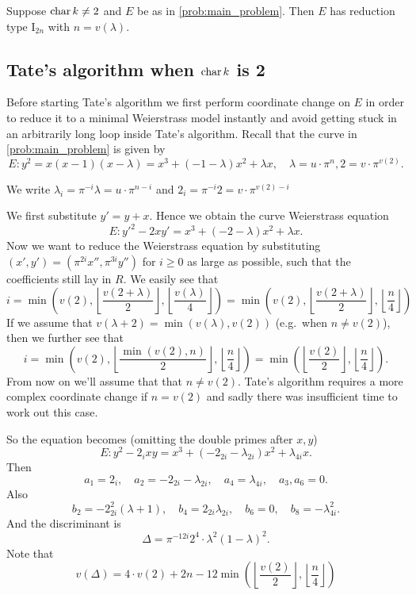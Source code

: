 \begin{proposition}
	Suppose $\operatorname{char} k \ne 2$ and $E$ be as in \cref{prob:main_problem}. 
	Then $E$ has reduction type $\mathrm I_{2n}$ with $n = v(\lambda)$. 
\end{proposition}

\subsection{Tate's algorithm when $\operatorname{char} k$ is 2}  \label{sec:char_k_is_2}

Before starting Tate's algorithm we first perform coordinate change on $E$ in order to reduce it to a minimal Weierstrass model instantly and avoid getting stuck in an arbitrarily long loop inside Tate's algorithm. 
Recall that the curve in \cref{prob:main_problem} is given by \[
	E: y^2 = x(x-1)(x-\lambda) = x^3 + (-1 -\lambda) x^2 + \lambda x, \quad \lambda = u \cdot \pi^{n}, 2 = v\cdot \pi^{v(2)}
.\] 
\begin{notation}
	We write $\lambda_i = \pi^{-i} \lambda = u\cdot \pi ^{n -i}$ and $2_i = \pi^{-i}2 = v \cdot \pi^{v(2) - i}$
\end{notation}
We first substitute $y' = y + x$. 
Hence we obtain the curve Weierstrass equation \[
	E: y'^2 - 2xy' = x^3 + (-2-\lambda) x^2 + \lambda x
.\] 
Now we want to reduce the Weierstrass equation by substituting $(x', y') = (\pi^{2i} x'', \pi^{3i}y'')$ for $i \ge 0$ as large as possible, such that the coefficients still lay in $R$. 
We easily see that \[
	i =  \min\left(v(2), \left\lfloor \frac{v(2 + \lambda)}{2} \right\rfloor,  \left\lfloor \frac{v(\lambda)}{4} \right\rfloor\right) = \min\left(v(2), \left\lfloor \frac{v(2 + \lambda)}{2} \right\rfloor,  \left\lfloor \frac{n}{4} \right\rfloor\right) 
\]
If we assume that $v(\lambda + 2) = \min(v(\lambda), v(2))$ (e.g.\ when $n \ne v(2)$), then we further see that \[
	i = \min\left(v(2), \left\lfloor \frac{\min (v(2), n)}{2} \right\rfloor,  \left\lfloor \frac{n}{4} \right\rfloor\right)  = \min\left(\left\lfloor \frac{v(2)}{2}\right\rfloor, \left\lfloor \frac{n}{4} \right\rfloor \right)
.\] 
From now on we'll assume that that $n \ne v(2)$. 
Tate's algorithm requires a more complex coordinate change if $n = v(2)$ and sadly there was insufficient time to work out this case. 

So the equation becomes (omitting the double primes after $x, y$) \[
	E: y^2 - 2_i xy = x^3 + (-2_{2i} - \lambda_{2i})x^2 + \lambda_{4i}x
.\] 
Then \[
a_1 = 2_i, \quad a_2 = -2_{2i} - \lambda_{2i}, \quad a_4 =  \lambda_{4i}, \quad a_3, a_6 = 0 
.\] 
Also 
\[
	b_2 = -2_{2i}^2 (\lambda + 1), \quad b_4 = 2_{2i}\lambda_{2i}, \quad b_6 = 0,\quad  b_8 = -\lambda_{4i}^2
.\] 
And the discriminant is \[
	\Delta = \pi^{-12i} 2^{4}\cdot \lambda^2(1 - \lambda)^2
.\] 
Note that \[
	v(\Delta) = 4\cdot v(2)+ 2n - 12 \min\left(\left\lfloor \frac{v(2)}{2}\right\rfloor, \left\lfloor \frac{n}{4} \right\rfloor \right)
\]

